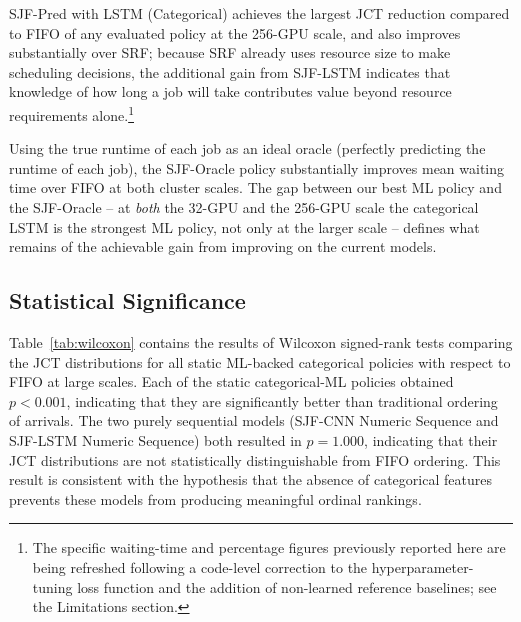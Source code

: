 SJF-Pred with LSTM (Categorical) achieves the largest JCT reduction compared to FIFO of any evaluated policy at the 256-GPU scale, and also improves substantially over SRF; because SRF already uses resource size to make scheduling decisions, the additional gain from SJF-LSTM indicates that knowledge of how long a job will take contributes value beyond resource requirements alone.\footnote{The specific waiting-time and percentage figures previously reported here are being refreshed following a code-level correction to the hyperparameter-tuning loss function and the addition of non-learned reference baselines; see the Limitations section.}

Using the true runtime of each job as an ideal oracle (perfectly predicting the runtime of each job), the SJF-Oracle policy substantially improves mean waiting time over FIFO at both cluster scales. The gap between our best ML policy and the SJF-Oracle -- at \emph{both} the 32-GPU and the 256-GPU scale the categorical LSTM is the strongest ML policy, not only at the larger scale -- defines what remains of the achievable gain from improving on the current models.

\clearpage
\subsection{Statistical Significance}

Table~\ref{tab:wilcoxon} contains the results of Wilcoxon signed-rank tests comparing the JCT distributions for all static ML-backed categorical policies with respect to FIFO at large scales. Each of the static categorical-ML policies obtained $p<0.001$, indicating that they are significantly better than traditional ordering of arrivals. The two purely sequential models (SJF-CNN Numeric Sequence and SJF-LSTM Numeric Sequence) both resulted in $p=1.000$, indicating that their JCT distributions are not statistically distinguishable from FIFO ordering. This result is consistent with the hypothesis that the absence of categorical features prevents these models from producing meaningful ordinal rankings.

